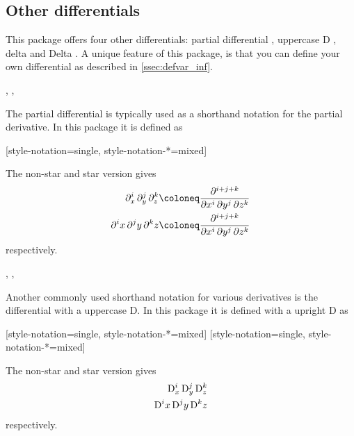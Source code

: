 	\subsection{Other differentials}
	This package offers four other differentials: partial differential \macro{\pdif}, uppercase D \macro{\mdif}, delta \macro{\fdif} and Delta \macro{\adif}. A unique feature of this package, is that you can define your own differential as described in \cref{ssec:defvar_inf}.
	
	\begin{function}{\pdif}
		\begin{syntax}
			\sarg, , 
		\end{syntax}
		The partial differential  is typically used as a shorthand notation for the partial derivative. In this package it is defined as
		
		\begin{definition}
			\DeclareDifferential{\pdif}{\partial}[style-notation=single,
			style-notation-*=mixed]%
		\end{definition}
		
		\noindent The non-star and star version gives
		\begin{align*}
			\pdif[order={i,j,k}]{x,y,z} &\coloneq \pdv[order={i,j,k}]{}{x,y,z} \\
			\pdif*[order={i,j,k}]{x,y,z} &\coloneq \pdv[order={i,j,k}]{}{x,y,z}
		\end{align*}
		respectively.
	\end{function}
	
	\begin{function}{\mdif}
		\begin{syntax}
			\sarg, , \marg{variables}
		\end{syntax}
		Another commonly used shorthand notation for various derivatives is the differential with a uppercase D. In this package it is defined with a upright D as
		
		\begin{definition}
			[style-notation=single,
			style-notation-*=mixed]%
			[style-notation=single,
			style-notation-*=mixed]%
		\end{definition}
		
		\noindent The non-star and star version gives
		\begin{align*}
			\mdif[order={i,j,k}]{x,y,z} \\
			\mdif*[order={i,j,k}]{x,y,z}
		\end{align*}
		respectively.
	\end{function}
	
